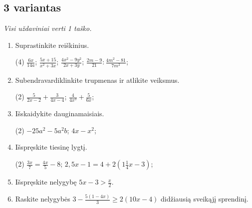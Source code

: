 \documentclass[a4paper]{article}
\begin{document}
\vspace*{12mm}

\subsection*{3 variantas}

\textit{Visi uždaviniai verti 1 taško.}

\begin{enumerate}
      \item Suprastinkite reiškinius.
            \begin{tasks}[item-format={\normalfont}, after-item-skip=2mm](4)
                  \task $\frac{6x}{14a}$;
                  \task $\frac{5x+15}{x^2+3x}$;
                  \task $\frac{4x^2-9y^2}{2x+3y}$;
                  \task $\frac{2m-9}{21}:\frac{4m^2-81}{7m^2}$;
            \end{tasks}

      \item Subendravardiklinkite trupmenas ir atlikite veiksmus.
            \begin{tasks}[item-format={\normalfont}, after-item-skip=2mm](2)
                  \task $\frac{5}{2x-2}+\frac{3}{4x-4}$;
                  \task $\frac{4}{4x^3}+\frac{5}{6x}$;
            \end{tasks}

      \item Išskaidykite dauginamaisiais.
            \begin{tasks}[item-format={\normalfont}, after-item-skip=2mm](2)
                  \task $-25a^2-5a^2b$;
                  \task $4x-x^2$;
            \end{tasks}

      \item Išspręskite tiesinę lygtį.
            \begin{tasks}[item-format={\normalfont}, after-item-skip=2mm](2)
                  \task $\frac{3x}{7}=\frac{4x}{5}-8$;
                  \task $2,5x-1=4+2(1\frac{1}{4}x-3)$;
            \end{tasks}

      \item Išspręskite nelygybę $5x-3>\frac{x}{2}$.
      \item Raskite nelygybės $3-\frac{5(1-4x)}{3}\geq2(10x-4)$ didžiausią sveikąjį sprendinį.
\end{enumerate}

\vspace*{12mm}
\end{document}
